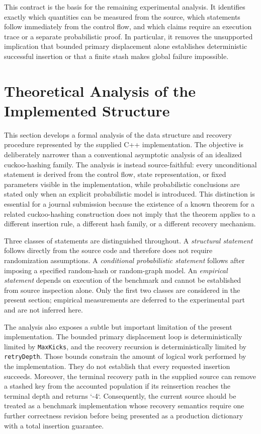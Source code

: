\documentclass[conference]{IEEEtran}
\begin{document}
This contract is the basis for the remaining experimental analysis. It identifies exactly which quantities can be measured from the source, which statements follow immediately from the control flow, and which claims require an execution trace or a separate probabilistic proof. In particular, it removes the unsupported implication that bounded primary displacement alone establishes deterministic successful insertion or that a finite stash makes global failure impossible.

\section{Theoretical Analysis of the Implemented Structure}

This section develops a formal analysis of the data structure and recovery procedure represented by the supplied C++ implementation. The objective is deliberately narrower than a conventional asymptotic analysis of an idealized cuckoo-hashing family. The analysis is instead source-faithful: every unconditional statement is derived from the control flow, state representation, or fixed parameters visible in the implementation, while probabilistic conclusions are stated only when an explicit probabilistic model is introduced. This distinction is essential for a journal submission because the existence of a known theorem for a related cuckoo-hashing construction does not imply that the theorem applies to a different insertion rule, a different hash family, or a different recovery mechanism.

Three classes of statements are distinguished throughout. A \emph{structural statement} follows directly from the source code and therefore does not require randomization assumptions. A \emph{conditional probabilistic statement} follows after imposing a specified random-hash or random-graph model. An \emph{empirical statement} depends on execution of the benchmark and cannot be established from source inspection alone. Only the first two classes are considered in the present section; empirical measurements are deferred to the experimental part and are not inferred here.

The analysis also exposes a subtle but important limitation of the present implementation. The bounded primary displacement loop is deterministically limited by \texttt{MaxKicks}, and the recovery recursion is deterministically limited by \texttt{retryDepth}. Those bounds constrain the amount of logical work performed by the implementation. They do not establish that every requested insertion succeeds. Moreover, the terminal recovery path in the supplied source can remove a stashed key from the accounted population if its reinsertion reaches the terminal depth and returns `-4`. Consequently, the current source should be treated as a benchmark implementation whose recovery semantics require one further correctness revision before being presented as a production dictionary with a total insertion guarantee.
\end{document}
